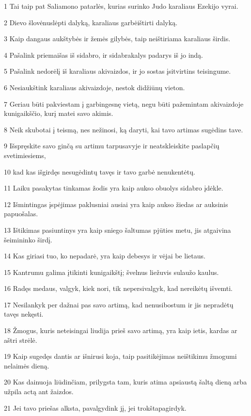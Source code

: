 \par 1 Tai taip pat Saliamono patarlės, kurias surinko Judo karaliaus Ezekijo vyrai. 
\par 2 Dievo šlovė­nuslėpti dalyką, karaliaus garbė­ištirti dalyką. 
\par 3 Kaip dangaus aukštybės ir žemės gilybės, taip neištiriama karaliaus širdis. 
\par 4 Pašalink priemaišas iš sidabro, ir sidabrakalys padarys iš jo indą. 
\par 5 Pašalink nedorėlį iš karaliaus akivaizdos, ir jo sostas įsitvirtins teisingume. 
\par 6 Nesiaukštink karaliaus akivaizdoje, nestok didžiūnų vieton. 
\par 7 Geriau būti pakviestam į garbingesnę vietą, negu būti pažemintam akivaizdoje kunigaikščio, kurį matei savo akimis. 
\par 8 Neik skubotai į teismą, nes nežinosi, ką daryti, kai tavo artimas sugėdins tave. 
\par 9 Išspręskite savo ginčą su artimu tarpusavyje ir neatskleiskite paslapčių svetimiesiems, 
\par 10 kad kas išgirdęs nesugėdintų tavęs ir tavo garbė nenukentėtų. 
\par 11 Laiku pasakytas tinkamas žodis yra kaip aukso obuolys sidabro įdėkle. 
\par 12 Išmintingas įspėjimas paklusniai ausiai yra kaip aukso žiedas ar auksinis papuošalas. 
\par 13 Ištikimas pasiuntinys yra kaip sniego šaltumas pjūties metu, jis atgaivina šeimininko širdį. 
\par 14 Kas giriasi tuo, ko nepadarė, yra kaip debesys ir vėjai be lietaus. 
\par 15 Kantrumu galima įtikinti kunigaikštį; švelnus liežuvis sulaužo kaulus. 
\par 16 Radęs medaus, valgyk, kiek nori, tik nepersivalgyk, kad nereikėtų išvemti. 
\par 17 Nesilankyk per dažnai pas savo artimą, kad nenusibostum ir jis nepradėtų tavęs nekęsti. 
\par 18 Žmogus, kuris neteisingai liudija prieš savo artimą, yra kaip ietis, kardas ar aštri strėlė. 
\par 19 Kaip sugedęs dantis ar išnirusi koja, taip pasitikėjimas neištikimu žmogumi nelaimės dieną. 
\par 20 Kas dainuoja liūdinčiam, prilygsta tam, kuris atima apsiaustą šaltą dieną arba užpila actą ant žaizdos. 
\par 21 Jei tavo priešas alksta, pavalgydink jį, jei trokšta­pagirdyk. 
